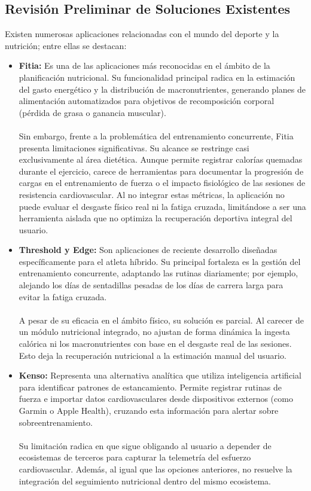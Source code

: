 \documentclass[12pt]{article}
\begin{document}
\subsection{Revisión Preliminar de Soluciones Existentes}
Existen numerosas aplicaciones relacionadas con el mundo del deporte y la nutrición; entre ellas se destacan:
\begin{itemize}
    \item \textbf{Fitia:} Es una de las aplicaciones más reconocidas en el ámbito de la planificación nutricional. Su funcionalidad principal radica en la estimación del gasto energético y la distribución de macronutrientes, generando planes de alimentación automatizados para objetivos de recomposición corporal (pérdida de grasa o ganancia muscular).
    \\\\
    Sin embargo, frente a la problemática del entrenamiento concurrente, Fitia presenta limitaciones significativas. Su alcance se restringe casi exclusivamente al área dietética. Aunque permite registrar calorías quemadas durante el ejercicio, carece de herramientas para documentar la progresión de cargas en el entrenamiento de fuerza o el impacto fisiológico de las sesiones de resistencia cardiovascular. Al no integrar estas métricas, la aplicación no puede evaluar el desgaste físico real ni la fatiga cruzada, limitándose a ser una herramienta aislada que no optimiza la recuperación deportiva integral del usuario.

    \item \textbf{Threshold y Edge:} Son aplicaciones de reciente desarrollo diseñadas específicamente para el atleta híbrido. Su principal fortaleza es la gestión del entrenamiento concurrente, adaptando las rutinas diariamente; por ejemplo, alejando los días de sentadillas pesadas de los días de carrera larga para evitar la fatiga cruzada.
    \\\\
    A pesar de su eficacia en el ámbito físico, su solución es parcial. Al carecer de un módulo nutricional integrado, no ajustan de forma dinámica la ingesta calórica ni los macronutrientes con base en el desgaste real de las sesiones. Esto deja la recuperación nutricional a la estimación manual del usuario.
\newpage
    \item \textbf{Kenso:} Representa una alternativa analítica que utiliza inteligencia artificial para identificar patrones de estancamiento. Permite registrar rutinas de fuerza e importar datos cardiovasculares desde dispositivos externos (como Garmin o Apple Health), cruzando esta información para alertar sobre sobreentrenamiento.
    \\\\
    Su limitación radica en que sigue obligando al usuario a depender de ecosistemas de terceros para capturar la telemetría del esfuerzo cardiovascular. Además, al igual que las opciones anteriores, no resuelve la integración del seguimiento nutricional dentro del mismo ecosistema.


\end{itemize}
\end{document}
